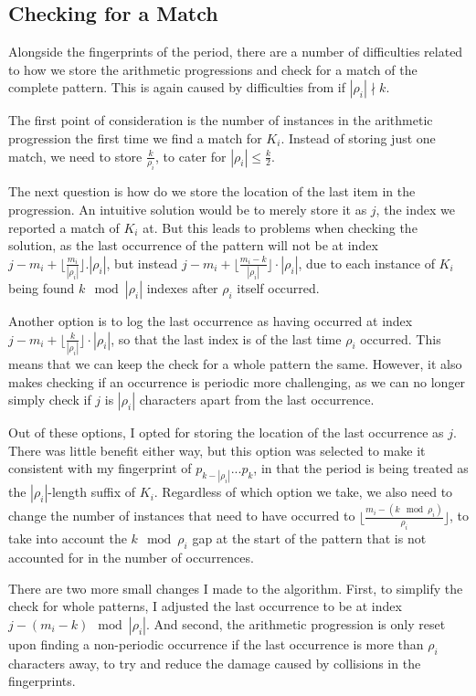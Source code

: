 \documentclass[ %
                    author={Dominic Joseph Moylett},
                    degree={MEng},
                     title={Dictionary Matching with Fingerprints},
                  subtitle={An Empirical Analysis},
                      type={research},
                      year={2015} ]{dissertation}
\begin{document}
\subsection{Checking for a Match}

Alongside the fingerprints of the period, there are a number of difficulties related to how we store the arithmetic progressions and check for a match of the complete pattern. This is again caused by difficulties from if $|\rho_i| \nmid k$.

The first point of consideration is the number of instances in the arithmetic progression the first time we find a match for $K_i$. Instead of storing just one match, we need to store $\frac{k}{\rho_i}$, to cater for $|\rho_i| \leq \frac{k}{2}$.

The next question is how do we store the location of the last item in the progression. An intuitive solution would be to merely store it as $j$, the index we reported a match of $K_i$ at. But this leads to problems when checking the solution, as the last occurrence of the pattern will not be at index $j - m_i + \lfloor\frac{m_i}{|\rho_i|}\rfloor.|\rho_i|$, but instead $j - m_i + \lfloor\frac{m_i - k}{|\rho_i|}\rfloor\cdot|\rho_i|$, due to each instance of $K_i$ being found $k \mod |\rho_i|$ indexes after $\rho_i$ itself occurred.

Another option is to log the last occurrence as having occurred at index $j - m_i + \lfloor\frac{k}{|\rho_i|}\rfloor\cdot|\rho_i|$, so that the last index is of the last time $\rho_i$ occurred. This means that we can keep the check for a whole pattern the same. However, it also makes checking if an occurrence is periodic more challenging, as we can no longer simply check if $j$ is $|\rho_i|$ characters apart from the last occurrence.

Out of these options, I opted for storing the location of the last occurrence as $j$. There was little benefit either way, but this option was selected to make it consistent with my fingerprint of $p_{k - |\rho_i|}...p_k$, in that the period is being treated as the $|\rho_i|$-length suffix of $K_i$. Regardless of which option we take, we also need to change the number of instances that need to have occurred to $\lfloor \frac{m_i - (k \mod \rho_i)}{\rho_i} \rfloor$, to take into account the $k \mod \rho_i$ gap at the start of the pattern that is not accounted for in the number of occurrences.

There are two more small changes I made to the algorithm. First, to simplify the check for whole patterns, I adjusted the last occurrence to be at index $j - (m_i - k) \mod |\rho_i|$. And second, the arithmetic progression is only reset upon finding a non-periodic occurrence if the last occurrence is more than $\rho_i$ characters away, to try and reduce the damage caused by collisions in the fingerprints.
\end{document}
